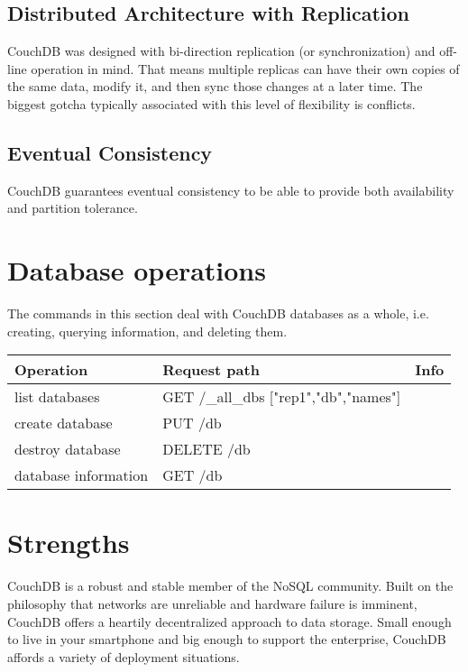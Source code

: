 \subsection{Distributed Architecture with Replication}

CouchDB was designed with bi-direction replication (or synchronization) and off-line operation in mind. That means multiple replicas can have their own copies of the same data, modify it, and then sync those changes at a later time. The biggest gotcha typically associated with this level of flexibility is conflicts.

\subsection{Eventual Consistency}

CouchDB guarantees eventual consistency to be able to provide both availability and partition tolerance.

\section{Database operations}

The commands in this section deal with CouchDB databases as a whole, i.e. creating, querying information, and deleting them.

\begin{tabularx}{0.95\textwidth}{ X X X }
Operation & Request path & Info \\
\hline
list databases & GET /\_all\_dbs ["rep1","db","names"] & \\
\hline
create database & PUT /db & \color{Bittersweet}{lowercase only} \\
\hline
destroy database & DELETE /db & \\
\hline
database information & 
GET /db & \\
\hline
\end{tabularx}

\section{Strengths}

CouchDB is a robust and stable member of the NoSQL community. Built on the philosophy that networks are unreliable and hardware failure is imminent, CouchDB offers a heartily decentralized approach to data storage. Small enough to live in your smartphone and big enough to support the enterprise, CouchDB affords a variety of deployment situations.

